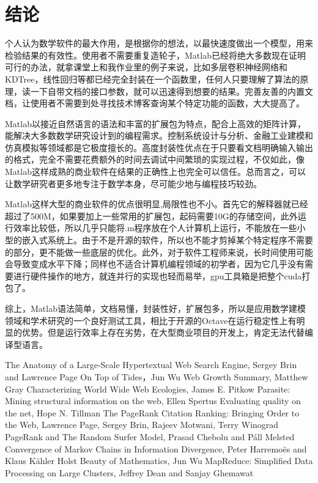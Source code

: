 \documentclass[a4paper, 14pt, twocolumn]{article}
\theoremstyle{definition}
\begin{document}
\section{结论}
个人认为数学软件的最大作用，是根据你的想法，以最快速度做出一个模型，用来检验结果的有效性。使用者不需要重复造轮子，Matlab已经将绝大多数现在证明可行的办法，就拿课堂上和我作业里的例子来说，比如多层卷积神经网络和KDTree，线性回归等都已经完全封装在一个函数里，任何人只要理解了算法的原理，读一下自带文档的接口参数，就可以迅速得到想要的结果。完善友善的内置文档，让使用者不需要到处寻找技术博客查询某个特定功能的函数，大大提高了。

Matlab以接近自然语言的语法和丰富的扩展包为特点，配合上高效的矩阵计算，能解决大多数数学研究设计到的编程需求。控制系统设计与分析、金融工业建模和仿真模拟等领域都是它极度擅长的。高度封装性优点在于只要看文档明确输入输出的格式，完全不需要花费额外的时间去调试中间繁琐的实现过程，不仅如此，像Matlab这样成熟的商业软件在结果的正确性上也完全可以信任。总而言之，可以让数学研究者更多地专注于数学本身，尽可能少地与编程技巧较劲。

Matlab这样大型的商业软件的优点很明显,局限性也不小。首先它的解释器就已经超过了500M，如果要加上一些常用的扩展包，起码需要10G的存储空间，此外运行效率比较低，所以几乎只能将.m程序放在个人计算机上运行，不能放在一些小型的嵌入式系统上。由于不是开源的软件，所以也不能才剪掉某个特定程序不需要的部分，更不能做一些底层的优化。此外，对于软件工程师来说，长时间使用可能会导致变成水平下降；同样也不适合计算机编程领域的初学者，因为它几乎没有需要进行硬件操作的地方，就连并行的实现也轻而易举，gpu工具箱是把整个cuda打包了。

综上，Matlab语法简单，文档易懂，封装性好，扩展包多，所以是应用数学建模领域和学术研究的一个良好测试工具，相比于开源的Octave在运行稳定性上有明显的优势。但是运行效率上存在劣势，在大型商业项目的开发上，肯定无法代替编译型语言。
\begin{thebibliography}{99}
	
	The Anatomy of a Large-Scale Hypertextual Web Search Engine, Sergey Brin and Lawrence Page
	 On Top of Tides，Jun Wu
	Web Growth Summary, Matthew Gray
	Characterizing World Wide Web Ecologies, James E. Pitkow
	Parasite: Mining structural information on the web, Ellen Spertus
	Evaluating quality on the net, Hope N. Tillman
	The PageRank Citation Ranking: Bringing Order to the Web, Lawrence Page, Sergey Brin, Rajeev Motwani, Terry Winograd
	PageRank and The Random Surfer Model, Prasad Chebolu and Páll Melsted
	Convergence of Markov Chains in Information Divergence, Peter Harremoës and Klaus Kähler Holst 
	 Beauty of Mathematics, Jun Wu
	MapReduce: Simplified Data Processing on Large Clusters, Jeffrey Dean and Sanjay Ghemawat
\end{thebibliography}
\end{document}
